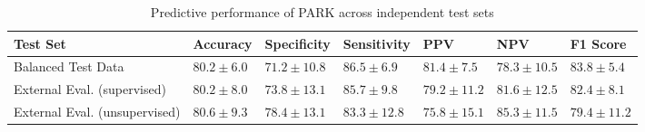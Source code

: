 \begin{table}
\caption{Predictive performance of PARK across independent test sets}
\label{tab:performance_summary}
\begin{tabular}{lllllll}
\toprule
Test Set & Accuracy & Specificity & Sensitivity & PPV & NPV & F1 Score \\
\midrule
Balanced Test Data  & $80.2 \pm 6.0$ & $71.2 \pm 10.8$ & $86.5 \pm 6.9$ & $81.4 \pm 7.5$ & $78.3 \pm 10.5$ & $83.8 \pm 5.4$ \\
External Eval. (supervised) & $80.2 \pm 8.0$ & $73.8 \pm 13.1$ & $85.7 \pm 9.8$ & $79.2 \pm 11.2$ & $81.6 \pm 12.5$ & $82.4 \pm 8.1$ \\
External Eval. (unsupervised) & $80.6 \pm 9.3$ & $78.4 \pm 13.1$ & $83.3 \pm 12.8$ & $75.8 \pm 15.1$ & $85.3 \pm 11.5$ & $79.4 \pm 11.2$ \\
\bottomrule
\end{tabular}
\end{table}

